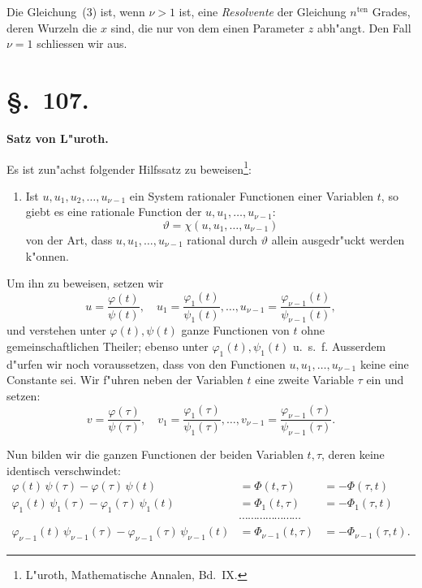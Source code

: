 \documentclass[12pt,a4paper]{article}
\theoremstyle{plain}
\begin{document}
Die Gleichung~(3) ist, wenn $\nu>1$ ist, eine \emph{Resolvente} der Gleichung $n^{\text{ten}}$ Grades, deren Wurzeln die $x$ sind, die nur von dem einen Parameter $z$ abh"angt. Den Fall $\nu=1$ schliessen wir aus.



\section*{\S.~107.}
\begin{center}
\large\bfseries Satz von L"uroth.
\end{center}
\vspace{0.5em}

Es ist zun"achst folgender Hilfssatz zu beweisen\footnote{L"uroth, Mathematische Annalen, Bd.~IX.}:

\begin{enumerate}[label=\arabic*.]
\item Ist $u, u_1, u_2, \ldots, u_{\nu-1}$ ein System rationaler Functionen einer Variablen $t$, so giebt es eine rationale Function der $u, u_1, \ldots, u_{\nu-1}$:
\[\vartheta = \chi(u, u_1, \ldots, u_{\nu-1})\]
von der Art, dass $u, u_1, \ldots, u_{\nu-1}$ rational durch $\vartheta$ allein ausgedr"uckt werden k"onnen.
\end{enumerate}

Um ihn zu beweisen, setzen wir
\begin{equation}\tag{1}
u = \frac{\varphi(t)}{\psi(t)}, \quad u_1 = \frac{\varphi_1(t)}{\psi_1(t)}, \ldots, u_{\nu-1} = \frac{\varphi_{\nu-1}(t)}{\psi_{\nu-1}(t)},
\end{equation}
und verstehen unter $\varphi(t), \psi(t)$ ganze Functionen von $t$ ohne gemeinschaftlichen Theiler; ebenso unter $\varphi_1(t), \psi_1(t)$ u.~s.~f. Ausserdem d"urfen wir noch voraussetzen, dass von den Functionen $u, u_1, \ldots, u_{\nu-1}$ keine eine Constante sei. Wir f"uhren neben der Variablen $t$ eine zweite Variable $\tau$ ein und setzen:
\begin{equation}\tag{2}
v = \frac{\varphi(\tau)}{\psi(\tau)}, \quad v_1 = \frac{\varphi_1(\tau)}{\psi_1(\tau)}, \ldots, v_{\nu-1} = \frac{\varphi_{\nu-1}(\tau)}{\psi_{\nu-1}(\tau)}.
\end{equation}

Nun bilden wir die ganzen Functionen der beiden Variablen $t, \tau$, deren keine identisch verschwindet:
\begin{equation}\tag{3}
\begin{aligned}
\varphi(t)\,\psi(\tau) - \varphi(\tau)\,\psi(t) &= \varPhi(t,\tau) &= -\varPhi(\tau,t)\\
\varphi_1(t)\,\psi_1(\tau) - \varphi_1(\tau)\,\psi_1(t) &= \varPhi_1(t,\tau) &= -\varPhi_1(\tau,t)\\
&\cdots\cdots\cdots\cdots\cdots\cdots\cdots&\\
\varphi_{\nu-1}(t)\,\psi_{\nu-1}(\tau) - \varphi_{\nu-1}(\tau)\,\psi_{\nu-1}(t) &= \varPhi_{\nu-1}(t,\tau) &= -\varPhi_{\nu-1}(\tau,t).
\end{aligned}
\end{equation}
\end{document}
